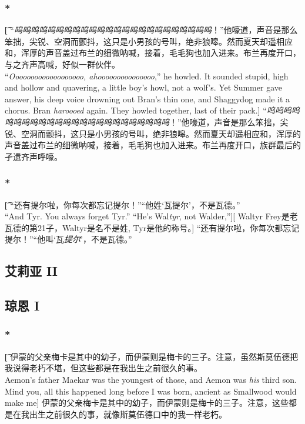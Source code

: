\documentclass[12pt,a4paper]{article}
\begin{document}
\subsubsection{\color{red}*}\t[
	“\emph{呜呜呜呜呜呜呜呜呜呜呜呜呜呜呜呜呜呜呜呜呜呜呜呜}！”他嚎道，声音是那么笨拙，尖锐、空洞而颤抖，这只是小男孩的号叫，绝非狼嗥。然而夏天却遥相应和，浑厚的声音盖过布兰的细微呐喊，接着，毛毛狗也加入进来。布兰再度开口，与之齐声高喊，好似一群伙伴。\\
	“\emph{Ooooooooooooooooooo, ahooooooooooooooo},” he howled. It sounded stupid, high and hollow and quavering, a little boy's howl, not a wolf's. Yet Summer gave answer, his deep voice drowning out Bran's thin one, and Shaggydog made it a chorus. Bran \emph{haroooed} again. They howled together, last of their pack.]
	“\emph{呜呜呜呜呜呜呜呜呜呜呜呜呜呜呜呜呜呜呜呜呜呜呜呜}！”他嚎道，声音是那么笨拙，尖锐、空洞而颤抖，这只是小男孩的号叫，绝非狼嗥。然而夏天却遥相应和，浑厚的声音盖过布兰的细微呐喊，接着，毛毛狗也加入进来。布兰再度开口，族群最后的孑遗齐声呼嚎。
	
\subsubsection{\color{red}*}\t[
	“还有提尔啦，你每次都忘记提尔！”“他姓‘瓦提尔’，不是瓦德。”\\
	“And Tyr. You always forget Tyr.” “He's Wal\emph{tyr}, not Walder,”][
	Waltyr Frey是老瓦德的第21子，Waltyr是名不是姓, Tyr是他的称号。]
	“还有提尔啦，你每次都忘记提尔！”“他叫‘瓦\emph{提尔}’，不是瓦德。”
	
\subsection{艾莉亚 II}

\subsection{琼恩 I}
\subsubsection{\color{red}*}\t[
	伊蒙的父亲梅卡是其中的幼子，而伊蒙则是梅卡的三子。注意，虽然斯莫伍德把我说得老朽不堪，但这些都是在我出生之前很久的事。\\
	Aemon's father Maekar was the youngest of those, and Aemon was \emph{his} third son. Mind you, all this happened long before I was born, ancient as Smallwood would make me]
	伊蒙的父亲梅卡是其中的幼子，而伊蒙则是梅卡的三子。注意，这些都是在我出生之前很久的事，就像斯莫伍德口中的我一样老朽。
	
\end{document}
